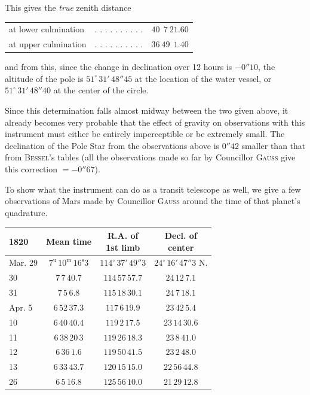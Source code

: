\begin{center}
This gives the \textit{true} zenith distance
\end{center}

\begin{center}
\begin{tabular}{l c l}
at lower culmination & . . . . . . . . . . & $40\ \ 7\ 21.60$ \\
at upper culmination & . . . . . . . . . . & $36\ 49\ \ 1.40$ \\
\end{tabular}
\end{center}

\noindent and from this, since the change in declination over 12 hours is $-0''10$, the altitude of the pole is $51^\circ\,31'\,48''\!45$ at the location of the water vessel, or $51^\circ\,31'\,48''\!40$ at the center of the circle.

\par\indent Since this determination falls almost midway between the two given above, it already becomes very probable that the effect of gravity on observations with this instrument must either be entirely imperceptible or be extremely small. The declination of the Pole Star from the observations above is $0''42$ smaller than that from \textsc{Bessel}’s tables (all the observations made so far by Councillor \textsc{Gauss} give this correction $=
-0''67$).

To show what the instrument can do as a transit telescope as well, we give a few observations of Mars made by Councillor \textsc{Gauss} around the time of that planet’s quadrature.

\begin{center}
\begin{tabular}{l|c|c|c}
1820 & Mean time & \shortstack{R.A. of\\1st limb} & \shortstack{Decl. of\\center} \\
\hline
Mar. 29 & $7^{\mathrm u}\,10^{\mathrm m}\,16^{\mathrm s}3$ & $114^\circ\,37'\,49''3$ & $24^\circ\,16'\,47''3$ N. \\
30 & $7\,7\,40.7$ & $114\,57\,57.7$ & $24\,12\,7.1$ \\
31 & $7\,5\,6.8$ & $115\,18\,30.1$ & $24\,7\,18.1$ \\
Apr. 5 & $6\,52\,37.3$ & $117\,6\,19.9$ & $23\,42\,5.4$ \\
10 & $6\,40\,40.4$ & $119\,2\,17.5$ & $23\,14\,30.6$ \\
11 & $6\,38\,20\,3$ & $119\,26\,18.3$ & $23\,8\,41.0$ \\
12 & $6\,36\,1.6$ & $119\,50\,41.5$ & $23\,2\,48.0$ \\
13 & $6\,33\,43.7$ & $120\,15\,15.0$ & $22\,56\,44.8$ \\
26 & $6\,5\,16.8$ & $125\,56\,10.0$ & $21\,29\,12.8$ \\
\end{tabular}
\end{center}

